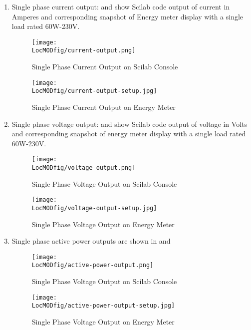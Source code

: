 \begin{enumerate}
\item Single phase current output:
 and  show Scilab code output of current in Amperes and corresponding snapshot of Energy meter display with a single load rated 60W-230V.

\begin{figure}
\centering
\texttt{[image: \\LocMODfig/current-output.png]}
\caption{Single Phase Current Output on Scilab Console}
\label{fig:current-console}
\end{figure}

\begin{figure}
\centering
\texttt{[image: \\LocMODfig/current-output-setup.jpg]}
\caption{Single Phase Current Output on Energy Meter}
\label{fig:current-meter}
\end{figure}

\item Single phase voltage output:
 and  show Scilab code output of voltage in Volts and corresponding snapshot of energy meter display with a single load rated 60W-230V.

\begin{figure}
\centering
\texttt{[image: \\LocMODfig/voltage-output.png]}
\caption{Single Phase Voltage Output on Scilab Console}
\label{fig:voltage-console}
\end{figure}

\begin{figure}
\centering
\texttt{[image: \\LocMODfig/voltage-output-setup.jpg]}
\caption{Single Phase Voltage Output on Energy Meter}
\label{fig:voltage-meter}
\end{figure}

\item Single phase active power  outputs are shown in  and 

\begin{figure}
\centering
\texttt{[image: \\LocMODfig/active-power-output.png]}
\caption{Single Phase Voltage Output on Scilab Console}
\label{fig:power-console}
\end{figure}

\begin{figure}
\centering
\texttt{[image: \\LocMODfig/active-power-output-setup.jpg]}
\caption{Single Phase Voltage Output on Energy Meter}
\label{fig:power-meter}
\end{figure}

\end{enumerate}


